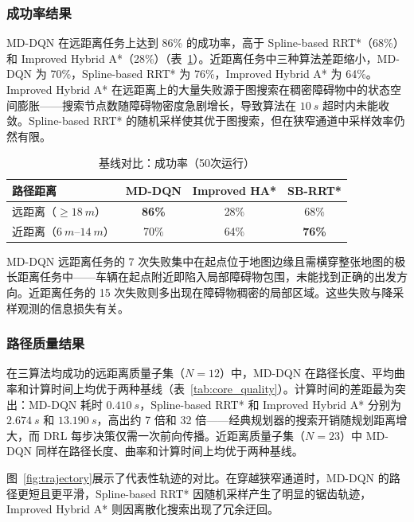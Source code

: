 \documentclass{iopjournal}
\begin{document}
\subsubsection{成功率结果}

MD-DQN 在远距离任务上达到 86\% 的成功率，高于 Spline-based RRT*（68\%）和 Improved Hybrid A*（28\%）（表~\ref{tab:core_sr}）。近距离任务中三种算法差距缩小，MD-DQN 为 70\%，Spline-based RRT* 为 76\%，Improved Hybrid A* 为 64\%。Improved Hybrid A* 在远距离上的大量失败源于图搜索在稠密障碍物中的状态空间膨胀——搜索节点数随障碍物密度急剧增长，导致算法在 $\SI{10}{s}$ 超时内未能收敛。Spline-based RRT* 的随机采样使其优于图搜索，但在狭窄通道中采样效率仍然有限。

\begin{table}[!htbp]
\centering
\caption{基线对比：成功率（50次运行）}
\label{tab:core_sr}
\begin{tabular}{lccc}
\toprule
路径距离 & MD-DQN & Improved HA* & SB-RRT* \\
\midrule
远距离（$\geq\SI{18}{m}$） & \textbf{86\%} & 28\% & 68\% \\
近距离（$\SI{6}{m}$--$\SI{14}{m}$） & 70\% & 64\% & \textbf{76\%} \\
\bottomrule
\end{tabular}
\end{table}

MD-DQN 远距离任务的 7 次失败集中在起点位于地图边缘且需横穿整张地图的极长距离任务中——车辆在起点附近即陷入局部障碍物包围，未能找到正确的出发方向。近距离任务的 15 次失败则多出现在障碍物稠密的局部区域。这些失败与降采样观测的信息损失有关。


\subsubsection{路径质量结果}

在三算法均成功的远距离质量子集（$N=12$）中，MD-DQN 在路径长度、平均曲率和计算时间上均优于两种基线（表~\ref{tab:core_quality}）。计算时间的差距最为突出：MD-DQN 耗时 $\SI{0.410}{s}$，Spline-based RRT* 和 Improved Hybrid A* 分别为 $\SI{2.674}{s}$ 和 $\SI{13.190}{s}$，高出约 7 倍和 32 倍——经典规划器的搜索开销随规划距离增大，而 DRL 每步决策仅需一次前向传播。近距离质量子集（$N=23$）中 MD-DQN 同样在路径长度、曲率和计算时间上均优于两种基线。

图~\ref{fig:trajectory}展示了代表性轨迹的对比。在穿越狭窄通道时，MD-DQN 的路径更短且更平滑，Spline-based RRT* 因随机采样产生了明显的锯齿轨迹，Improved Hybrid A* 则因离散化搜索出现了冗余迂回。
\end{document}
